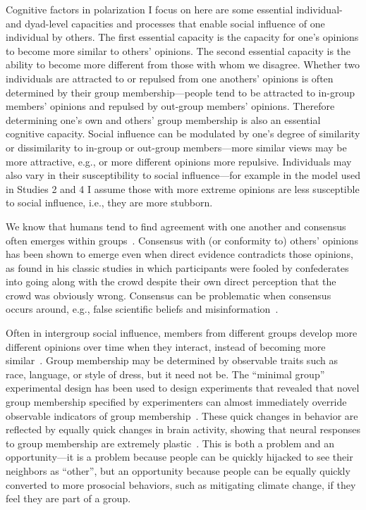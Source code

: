 Cognitive factors in polarization I focus on here are some essential
individual- and dyad-level capacities and processes that
enable social influence of one individual by others. The first essential capacity
is the capacity for one's opinions to become more similar to others' opinions.
The second essential capacity is the ability to become more different from those
with whom we disagree. Whether two individuals are attracted to or repulsed
from one anothers' opinions is often determined by their group membership---people
tend to be attracted to in-group members' opinions and repulsed by out-group
members' opinions. Therefore determining one's own and others' group membership is also an essential
cognitive capacity. Social influence can be modulated by one's degree of
similarity or dissimilarity to in-group or out-group members---more similar
views may be more attractive, e.g., or more different opinions more repulsive.
Individuals may also vary in their susceptibility to social influence---for
example in the model used in Studies 2 and 4 I assume those with more
extreme opinions are less susceptible to social influence, i.e., 
they are more stubborn.

We know that humans tend to find agreement with one another and consensus often 
emerges within groups~\cite{Festinger1954,Cartwright1956,French1956}. 
Consensus with (or conformity to) others' opinions has been shown to emerge 
even when direct evidence contradicts those opinions, as 
found in his classic studies in which participants were fooled by confederates
into going along with the crowd despite their own direct perception that
the crowd was obviously wrong. Consensus can be problematic when
consensus occurs around, e.g., 
false scientific beliefs and 
misinformation~\cite{Zollman2007,Zollman2013,OConnor2018,OConnor2019e}.

Often in intergroup social influence, members from different groups
develop more different opinions over time when they interact, instead of becoming more 
similar~\cite{Tajfel1979,Sherif1988,Flache2011,Bail2018}.
Group membership may be determined by observable traits such as race, language,
or style of dress, but it need not be. The ``minimal group'' experimental design has 
been used to design experiments that revealed that novel group membership
specified by experimenters can almost immediately override observable
indicators of group membership~\cite{Tajfel1971,Billig1973,Tajfel1982}.
These quick changes in behavior are reflected by equally quick changes in 
brain activity, showing that neural responses to group membership are
extremely plastic~\cite{Cikara2014,Cikara2017}. This is both a problem and
an opportunity---it is a problem because people can be quickly hijacked to
see their neighbors as ``other'', but an opportunity because people can be
equally quickly converted to more prosocial behaviors, such as mitigating
climate change, if they feel they are part of a group.

